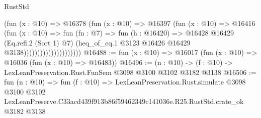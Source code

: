 \begin{lexlean}{RustStd}
\begin{coremodule}
                                    (fun (x : @10) =>
                                    @16378
                                      (fun (x : @10) =>
                                      @16397
                                        (fun (x : @10) =>
                                        @16416
                                          (fun (x : @10) =>
                                          fun (fn : @7) =>
                                          fun (h : @16420) =>
                                          @16428
                                            @16429
                                            (Eq.refl.{2} (Sort 1) @7)
                                            (heq_of_eq.{1}
                                              @3123
                                              @16426
                                              @16429
                                              @3138)))))))))))))))))))))
@16488 := fun (x : @10) => @16017 (fun (x : @10) => @16036 (fun (x : @10) => @16483))
@16496 := (n : @10) -> (f : @10) -> LexLeanPreservation.Rust.FunSem @3098 @3100 @3102 @3182 @3138
@16506 := fun (n : @10) =>
  fun (f : @10) =>
  LexLeanPreservation.Rust.simulate
    @3098
    @3100
    @3102
    LexLeanPreserve.C33acd439f913b86f59462349c141036e.R25.RustStd.crate_ok
    @3182
    @3138
\end{coremodule}
\end{lexlean}
